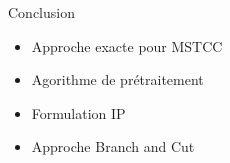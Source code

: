\begin{frame}{Conclusion}
\begin{itemize}
\item Approche exacte pour MSTCC
\item Agorithme de prétraitement
\item Formulation IP
\item Approche Branch and Cut
\end{itemize}
    
\end{frame}
